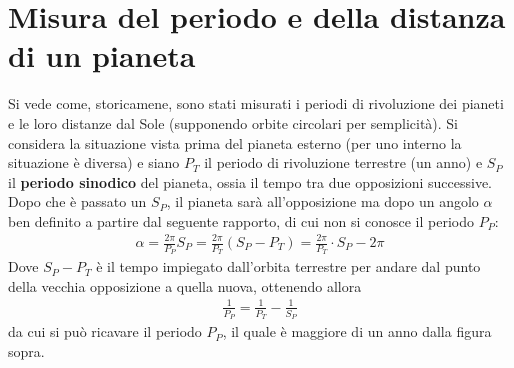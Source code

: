 \documentclass[a4paper, oneside]{book}
\begin{document}
\section{Misura del periodo e della distanza di un pianeta}
\begin{figure}
    \centering
\end{figure}
Si vede come, storicamene, sono stati misurati i periodi di rivoluzione dei pianeti 
e le loro distanze dal Sole (supponendo orbite circolari per semplicità). 
Si considera la situazione vista prima del pianeta esterno (per uno interno 
la situazione è diversa) e siano $P_T$ il periodo di rivoluzione terrestre (un anno) 
e $S_P$ il \textbf{periodo sinodico} del pianeta, ossia il tempo tra due opposizioni successive. 
Dopo che è passato un $S_P$, il pianeta sarà all'opposizione ma dopo un 
angolo $\alpha$ ben definito a partire dal seguente rapporto, di 
cui non si conosce il periodo $P_P$:
\begin{gather*}
    \alpha = \frac{2\pi}{P_P}S_P = \frac{2\pi}{P_T}(S_P - P_T) = \frac{2\pi}{P_T} \cdot S_P - 2\pi 
\end{gather*}
Dove $S_P - P_T$ è il tempo impiegato dall'orbita terrestre 
per andare dal punto della vecchia opposizione a quella nuova, 
ottenendo allora 
\begin{gather*}
    \frac{1}{P_P} = \frac{1}{P_T}  - \frac{1}{S_P}
\end{gather*}
da cui si può ricavare il periodo $P_P$, il quale è maggiore di un anno dalla figura sopra. 
\end{document}
